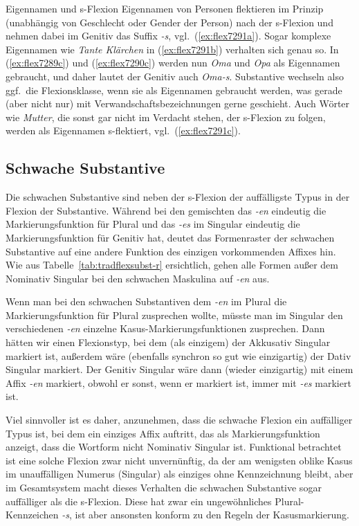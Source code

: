 \begin{Vertiefung}{Eigennamen und s-Flexion}
Eigennamen von Personen flektieren im Prinzip (unabhängig von Geschlecht oder Gender der Person) nach der s-Flexion und nehmen dabei im Genitiv das Suffix \textit{-s}, vgl.\ (\ref{ex:flex7291a}).
Sogar komplexe Eigennamen wie \textit{Tante Klärchen} in (\ref{ex:flex7291b}) verhalten sich genau so.
In (\ref{ex:flex7289c}) und (\ref{ex:flex7290c}) werden nun \textit{Oma} und \textit{Opa} als Eigennamen gebraucht, und daher lautet der Genitiv auch \textit{Oma-s}.
Substantive wechseln also ggf.\ die Flexionsklasse, wenn sie als Eigennamen gebraucht werden, was gerade (aber nicht nur) mit Verwandschaftsbezeichnungen gerne geschieht.
Auch Wörter wie \textit{Mutter}, die sonst gar nicht im Verdacht stehen, der s-Flexion zu folgen, werden als Eigennamen s-flektiert, vgl.\ (\ref{ex:flex7291c}).

\end{Vertiefung}

\subsection{Schwache Substantive}

\label{sec:schwachsubst}


Die schwachen Substantive sind neben der s-Flexion der auffälligste Typus in der Flexion der Substantive.
Während bei den gemischten das \textit{-en} eindeutig die Markierungsfunktion für Plural und das \textit{-es} im Singular eindeutig die Markierungsfunktion für Genitiv hat, deutet das Formenraster der schwachen Substantive auf eine andere Funktion des einzigen vorkommenden Affixes hin.
Wie aus Tabelle~\ref{tab:tradflexsubst-r} ersichtlich, gehen alle Formen außer dem Nominativ Singular bei den schwachen Maskulina auf \textit{-en} aus.

Wenn man bei den schwachen Substantiven dem \textit{-en} im Plural die Markierungsfunktion für Plural zusprechen wollte, müsste man im Singular den verschiedenen \textit{-en} einzelne Kasus-Markierungsfunktionen zusprechen.
Dann hätten wir einen Flexionstyp, bei dem (als einzigem) der Akkusativ Singular markiert ist, außerdem wäre (ebenfalls synchron so gut wie einzigartig) der Dativ Singular markiert.
Der Genitiv Singular wäre dann (wieder einzigartig) mit einem Affix \textit{-en} markiert, obwohl er sonst, wenn er markiert ist, immer mit \textit{-es} markiert ist.

Viel sinnvoller ist es daher, anzunehmen, dass die schwache Flexion ein auffälliger Typus ist, bei dem ein einziges Affix auftritt, das als Markierungsfunktion anzeigt, dass die Wortform nicht Nominativ Singular ist.
Funktional betrachtet ist eine solche Flexion zwar nicht unvernünftig, da der am wenigsten oblike Kasus im unauffälligen Numerus (Singular) als einziges ohne Kennzeichnung bleibt, aber im Gesamtsystem macht dieses Verhalten die schwachen Substantive sogar auffälliger als die s-Flexion.
Diese hat zwar ein ungewöhnliches Plural-Kennzeichen \textit{-s}, ist aber ansonsten konform zu den Regeln der Kasusmarkierung.

